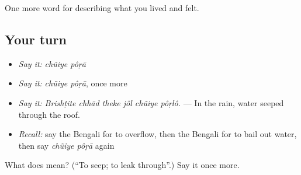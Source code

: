 \begin{grammarlens}[title={What you've built}]
One more word for describing what you lived and felt.
\end{grammarlens}

\subsection*{Your turn}
\begin{itemize}
\raggedright
  \item \emph{Say it:} \emph{chũiye pôṛā}
  \item \emph{Say it:} \emph{chũiye pôṛā}, once more
  \item \emph{Say it:} \emph{Brishṭite chhād theke jôl chũiye pôṛlô.} — In the rain, water seeped through the roof.
  \item \emph{Recall:} say the Bengali for to overflow, then the Bengali for to bail out water, then say \emph{chũiye pôṛā} again
\end{itemize}

\begin{tcolorbox}[breakable,colback=teal!4,colframe=teal!35!black,title={Before you move on}]
What does   mean? (\textquotedblleft{}To seep; to leak through\textquotedblright{}.) Say it once more.
\end{tcolorbox}
